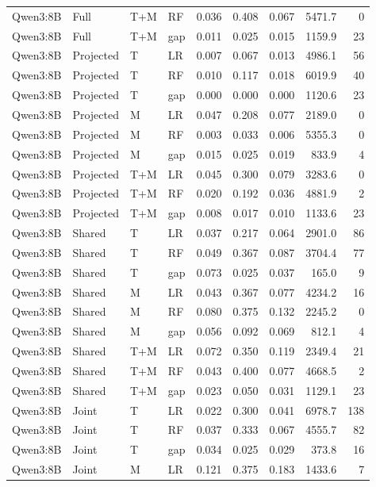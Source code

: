 \begin{longtable}{@{}P{.14\textwidth}P{.13\textwidth}P{.05\textwidth}P{.21\textwidth}rrrrr@{}}
Qwen3:8B & Full & T+M & RF & 0.036 & 0.408 & 0.067 & 5471.7 & 0 \\
Qwen3:8B & Full & T+M & gap & 0.011 & 0.025 & 0.015 & 1159.9 & 23 \\
Qwen3:8B & Projected & T & LR & 0.007 & 0.067 & 0.013 & 4986.1 & 56 \\
Qwen3:8B & Projected & T & RF & 0.010 & 0.117 & 0.018 & 6019.9 & 40 \\
Qwen3:8B & Projected & T & gap & 0.000 & 0.000 & 0.000 & 1120.6 & 23 \\
Qwen3:8B & Projected & M & LR & 0.047 & 0.208 & 0.077 & 2189.0 & 0 \\
Qwen3:8B & Projected & M & RF & 0.003 & 0.033 & 0.006 & 5355.3 & 0 \\
Qwen3:8B & Projected & M & gap & 0.015 & 0.025 & 0.019 & 833.9 & 4 \\
Qwen3:8B & Projected & T+M & LR & 0.045 & 0.300 & 0.079 & 3283.6 & 0 \\
Qwen3:8B & Projected & T+M & RF & 0.020 & 0.192 & 0.036 & 4881.9 & 2 \\
Qwen3:8B & Projected & T+M & gap & 0.008 & 0.017 & 0.010 & 1133.6 & 23 \\
Qwen3:8B & Shared & T & LR & 0.037 & 0.217 & 0.064 & 2901.0 & 86 \\
Qwen3:8B & Shared & T & RF & 0.049 & 0.367 & 0.087 & 3704.4 & 77 \\
Qwen3:8B & Shared & T & gap & 0.073 & 0.025 & 0.037 & 165.0 & 9 \\
Qwen3:8B & Shared & M & LR & 0.043 & 0.367 & 0.077 & 4234.2 & 16 \\
Qwen3:8B & Shared & M & RF & 0.080 & 0.375 & 0.132 & 2245.2 & 0 \\
Qwen3:8B & Shared & M & gap & 0.056 & 0.092 & 0.069 & 812.1 & 4 \\
Qwen3:8B & Shared & T+M & LR & 0.072 & 0.350 & 0.119 & 2349.4 & 21 \\
Qwen3:8B & Shared & T+M & RF & 0.043 & 0.400 & 0.077 & 4668.5 & 2 \\
Qwen3:8B & Shared & T+M & gap & 0.023 & 0.050 & 0.031 & 1129.1 & 23 \\
Qwen3:8B & Joint & T & LR & 0.022 & 0.300 & 0.041 & 6978.7 & 138 \\
Qwen3:8B & Joint & T & RF & 0.037 & 0.333 & 0.067 & 4555.7 & 82 \\
Qwen3:8B & Joint & T & gap & 0.034 & 0.025 & 0.029 & 373.8 & 16 \\
Qwen3:8B & Joint & M & LR & 0.121 & 0.375 & 0.183 & 1433.6 & 7 \\

\end{longtable}
